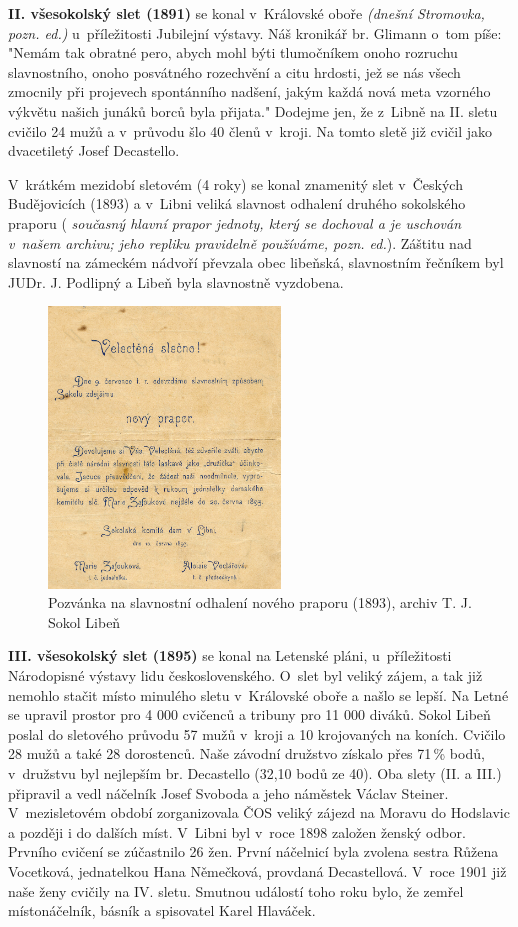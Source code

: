 \documentclass[a5paper, 11pt, twoside]{article}
\newcommand{\pozned}[1]{%
\textit{#1}}
\begin{document}
\textbf{II. všesokolský slet (1891)} se konal v~Královské oboře \pozned{(dnešní Stromovka, pozn. ed.)} u~příležitosti Jubilejní výstavy. Náš kronikář br. Glimann o~tom píše: "Nemám tak obratné pero, abych mohl býti tlumočníkem onoho rozruchu slavnostního, onoho posvátného rozechvění a citu hrdosti, jež se nás všech zmocnily při projevech spontánního nadšení, jakým každá nová meta vzorného výkvětu našich junáků borců byla přijata." Dodejme jen, že z~Libně na II. sletu cvičilo 24 mužů a v~průvodu šlo 40 členů v~kroji. Na tomto sletě již cvičil jako dvacetiletý Josef Decastello.

V~krátkém mezidobí sletovém (4 roky) se konal znamenitý slet v~Českých Budějovicích (1893) a v~Libni veliká slavnost odhalení druhého sokolského praporu (\pozned{současný hlavní prapor jednoty, který se dochoval a je uschován v~našem archivu; jeho repliku pravidelně používáme, pozn. ed.}). Záštitu nad slavností na zámeckém nádvoří převzala obec libeňská, slavnostním řečníkem byl JUDr. J. Podlipný a Libeň byla slavnostně vyzdobena.

\begin{figure}[h!]
  \centering
  \includegraphics[width=0.55\textwidth]{img/10_pozvanka_prapor.jpg}
  \caption*{Pozvánka na slavnostní odhalení nového praporu (1893), archiv T. J. Sokol Libeň}
\end{figure}

\textbf{III. všesokolský slet (1895)} se konal na Letenské pláni, u~příležitosti Národopisné výstavy lidu československého. O~slet byl veliký zájem, a tak již nemohlo stačit místo minulého sletu v~Královské oboře a našlo se lepší. Na Letné se upravil prostor pro 4 000 cvičenců a tribuny pro 11 000 diváků. Sokol Libeň poslal do sletového průvodu 57 mužů v~kroji a 10 krojovaných na koních. Cvičilo 28 mužů a také 28 dorostenců. Naše závodní družstvo získalo přes 71\,\% bodů, v~družstvu byl nejlepším br. Decastello (32,10 bodů ze 40). Oba slety (II. a III.) připravil a vedl náčelník Josef Svoboda a jeho náměstek Václav Steiner. V~mezisletovém období zorganizovala ČOS veliký zájezd na Moravu do Hodslavic a později i do dalších míst. V~Libni byl v~roce 1898 založen ženský odbor. Prvního cvičení se zúčastnilo 26 žen. První náčelnicí byla zvolena sestra Růžena Vocetková, jednatelkou Hana Němečková, provdaná Decastellová. V~roce 1901 již naše ženy cvičily na IV. sletu. Smutnou událostí toho roku bylo, že zemřel místonáčelník, básník a spisovatel Karel Hlaváček.
\end{document}
